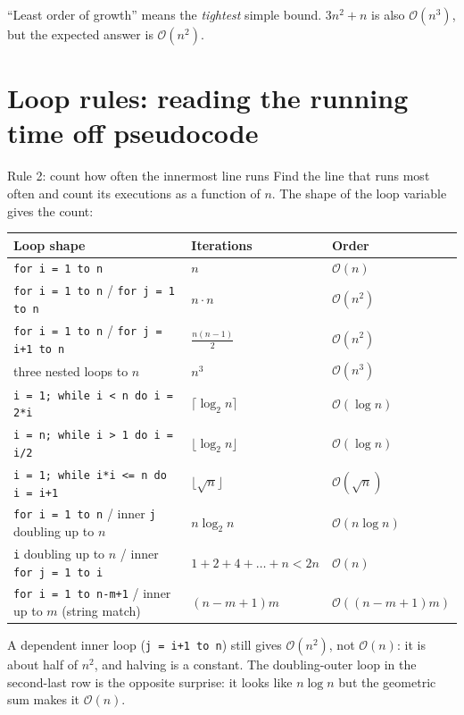 \documentclass{fkt-notes}
\newcommand{\Oh}{\mathcal{O}}
\begin{document}
\begin{trap}
``Least order of growth'' means the \emph{tightest} simple bound. $3n^2+n$ is also $\Oh(n^3)$, but the expected answer is $\Oh(n^2)$.
\end{trap}

\section{Loop rules: reading the running time off pseudocode}
\label{sec:loops}

\begin{rulebox}{Rule 2: count how often the innermost line runs}
Find the line that runs most often and count its executions as a function of $n$. The shape of the loop variable gives the count:
\end{rulebox}

\begin{center}
\small
\begin{tabular}{@{}p{7.4cm}p{3.4cm}l@{}}
\toprule
Loop shape & Iterations & Order \\
\midrule
\texttt{for i = 1 to n} & $n$ & $\Oh(n)$ \\
\texttt{for i = 1 to n} / \texttt{for j = 1 to n} & $n\cdot n$ & $\Oh(n^2)$ \\
\texttt{for i = 1 to n} / \texttt{for j = i+1 to n} & $\frac{n(n-1)}2$ & $\Oh(n^2)$ \\
three nested loops to $n$ & $n^3$ & $\Oh(n^3)$ \\
\texttt{i = 1; while i < n do i = 2*i} & $\lceil\log_2 n\rceil$ & $\Oh(\log n)$ \\
\texttt{i = n; while i > 1 do i = i/2} & $\lfloor\log_2 n\rfloor$ & $\Oh(\log n)$ \\
\texttt{i = 1; while i*i <= n do i = i+1} & $\lfloor\sqrt n\rfloor$ & $\Oh(\sqrt n)$ \\
\texttt{for i = 1 to n} / inner \texttt{j} doubling up to $n$ & $n\log_2 n$ & $\Oh(n\log n)$ \\
\texttt{i} doubling up to $n$ / inner \texttt{for j = 1 to i} & $1+2+4+\dots+n<2n$ & $\Oh(n)$ \\
\texttt{for i = 1 to n-m+1} / inner up to $m$ (string match) & $(n-m+1)m$ & $\Oh((n-m+1)m)$ \\
\bottomrule
\end{tabular}
\end{center}

\begin{trap}
A dependent inner loop (\texttt{j = i+1 to n}) still gives $\Oh(n^2)$, not $\Oh(n)$: it is about half of $n^2$, and halving is a constant. The doubling-outer loop in the second-last row is the opposite surprise: it looks like $n\log n$ but the geometric sum makes it $\Oh(n)$.
\end{trap}
\end{document}
